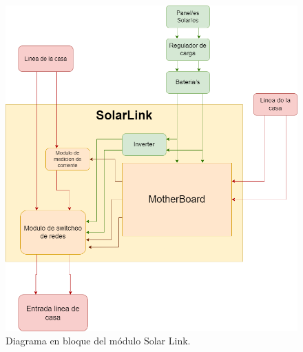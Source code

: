 \begin{figure}[H]
    \centering
    \includegraphics[width=1\linewidth]{analisis-tecnico/Diagrama en bloques.png}
    \caption{Diagrama en bloque del módulo Solar Link.}
    \label{fig:bloque2-solarlink}
\end{figure}

